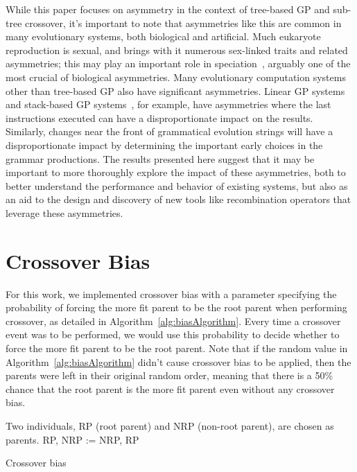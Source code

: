 \documentclass{sig-alternate}
\begin{document}
While this paper focuses on asymmetry in the context of tree-based GP and sub-tree crossover, it's important to 
note that asymmetries like this are common in many evolutionary systems, both biological and artificial. Much 
eukaryote reproduction is sexual, and brings with it numerous sex-linked traits and related asymmetries; this may
play an important role in speciation~\cite{qvarnstrom2009speciation}, arguably one of the most crucial of 
biological asymmetries.
Many evolutionary computation systems other than tree-based GP also have 
significant asymmetries. Linear GP systems~\cite{brameier2007linear} and stack-based GP 
systems~\cite{spector:2002:GPEM}, for example, have asymmetries where the last instructions executed can have a 
disproportionate impact on the results. Similarly, changes near the front of grammatical evolution 
\cite{o2003grammatical} strings will have a 
disproportionate impact by determining the important early choices in the grammar productions. 
The results presented here suggest that it may be important to more thoroughly explore the impact of these asymmetries, both to better understand the performance and behavior of existing systems, but also as an aid to the design and discovery of new tools like recombination operators that leverage these asymmetries.

\section{Crossover Bias} \label{sec:XObias}

For this work, we implemented crossover bias with a parameter specifying the probability of forcing 
the more fit parent to be the root parent when performing crossover, as detailed in 
Algorithm~\ref{alg:biasAlgorithm}. Every time a 
crossover event was to be performed, we would use this probability to decide whether to force the 
more fit parent to be the root parent. Note that if the random value in Algorithm~\ref{alg:biasAlgorithm} 
didn't cause crossover bias to be applied, then the parents were left in their original random order, 
meaning that there is a 50\% chance that the root 
parent is the more fit parent even without any crossover bias.

\begin{algorithm}[tb]
\begin{algorithmic}
\Require Two individuals, RP (root parent) and NRP (non-root parent), are chosen as parents.
 
        \State RP, NRP := NRP, RP  
    \EndIf
\EndIf
\end{algorithmic}
\caption{Crossover bias}
\label{alg:biasAlgorithm}
\end{algorithm}
\end{document}
